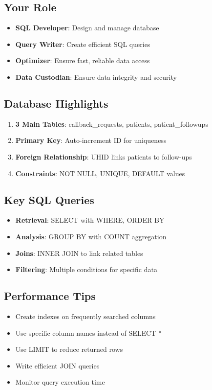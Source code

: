 \documentclass[12pt,a4paper]{article}
\begin{document}
\subsection{Your Role}
\begin{itemize}
    \item \textbf{SQL Developer}: Design and manage database
    \item \textbf{Query Writer}: Create efficient SQL queries
    \item \textbf{Optimizer}: Ensure fast, reliable data access
    \item \textbf{Data Custodian}: Ensure data integrity and security
\end{itemize}

\subsection{Database Highlights}
\begin{enumerate}
    \item \textbf{3 Main Tables}: callback\_requests, patients, patient\_followups
    \item \textbf{Primary Key}: Auto-increment ID for uniqueness
    \item \textbf{Foreign Relationship}: UHID links patients to follow-ups
    \item \textbf{Constraints}: NOT NULL, UNIQUE, DEFAULT values
\end{enumerate}

\subsection{Key SQL Queries}
\begin{itemize}
    \item \textbf{Retrieval}: SELECT with WHERE, ORDER BY
    \item \textbf{Analysis}: GROUP BY with COUNT aggregation
    \item \textbf{Joins}: INNER JOIN to link related tables
    \item \textbf{Filtering}: Multiple conditions for specific data
\end{itemize}

\subsection{Performance Tips}
\begin{itemize}
    \item Create indexes on frequently searched columns
    \item Use specific column names instead of SELECT *
    \item Use LIMIT to reduce returned rows
    \item Write efficient JOIN queries
    \item Monitor query execution time
\end{itemize}

\end{document}
